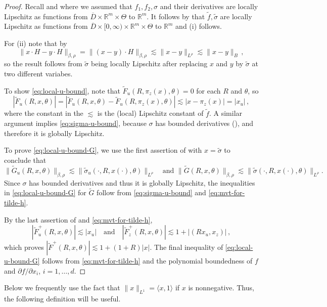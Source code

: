 \documentclass[final]{amsart}
\numberwithin{thm}{section}
\numberwithin{equation}{section}
\newcommand{\R}{\mathbb{R}}
\newcommand{\ip}[2]{\langle #1, #2 \rangle}
\begin{document}
\begin{proof}
    Recall  and  where we assumed that $f_1,f_2,\sigma$ and their derivatives are locally Lipschitz as functions from $\overline D \times \R^m \times \Theta$ to $\R^m$. It follows by  that $\tilde f,\tilde \sigma$ are locally Lipschitz as functions from $\overline D \times [0,\infty) \times \R^m \times \Theta$ to $\R^m$ and (i) follows. 
    
    For (ii) note that by 
    $$\|x\cdot H - y\cdot H\|_{\beta,\rho} = 
    \|(x-y)\cdot H\|_{\beta,\rho}
    \lesssim \|x - y\|_{L^\rho} \lesssim \|x - y\|_B \,,$$
    so the result follows from $\tilde \sigma$ being locally Lipschitz after replacing $x$ and $y$ by $\tilde \sigma$ at two different variabes.

    To show \eqref{eq:local-u-bound}, note that $\tilde F_u(R,\pi_z(x),\theta) = 0$ for each $R$ and $\theta$, so
    $$
    |\tilde F_u(R,x,\theta)| = |\tilde F_u(R,x,\theta) - \tilde F_u(R,\pi_z(x),\theta)| \lesssim |x-\pi_z(x)| = |x_u| \,,
    $$
    where the constant in the $\lesssim$ is the (local) Lipschitz constant of $\tilde f$. A similar argument implies \eqref{eq:sigma-u-bound}, because $\sigma$ has bounded derivatives (), and therefore it is globally Lipschitz.

    To prove \eqref{eq:local-u-bound-G}, we use the first assertion of  with $x = \tilde{\sigma}$
    to conclude that
    $$\|\tilde G_u(R,x,\theta)\|_{\beta,\rho} \lesssim \|\tilde \sigma_u(\cdot,R,x(\cdot),\theta)\|_{L^\rho} \quad \text{and  } \|\tilde G(R,x,\theta)\|_{\beta,\rho} \lesssim \|\tilde \sigma(\cdot,R,x(\cdot),\theta)\|_{L^\rho}.$$
    Since $\sigma$ 
    has bounded derivatives and thus it is globally Lipschitz, the inequalities in \eqref{eq:local-u-bound-G}
    for $\tilde G$ follow from \eqref{eq:sigma-u-bound} and \eqref{eq:mvt-for-tilde-h}.

    By the last assertion of  and \eqref{eq:mvt-for-tilde-h},
    $$|\tilde F_u^+(R,x,\theta)| \lesssim |x_u| \quad \text{and} \quad |\tilde F_z^+(R,x,\theta)| \lesssim 1 + |(Rx_u,x_z)| \,,$$
    which proves $|\tilde F^+(R,x,\theta)| \lesssim 1 + (1+R)|x|$. The final inequality of \eqref{eq:local-u-bound-G} follows from \eqref{eq:mvt-for-tilde-h} and the polynomial boundedness of $f$ and $\partial f/\partial x_i$, $i = 1,\dots,d$.
\end{proof}

Below we frequently use the fact that $\|x\|_{L^1} = \ip{x}{1}$ if $x$ is nonnegative. Thus, the following definition will be useful.
\end{document}
